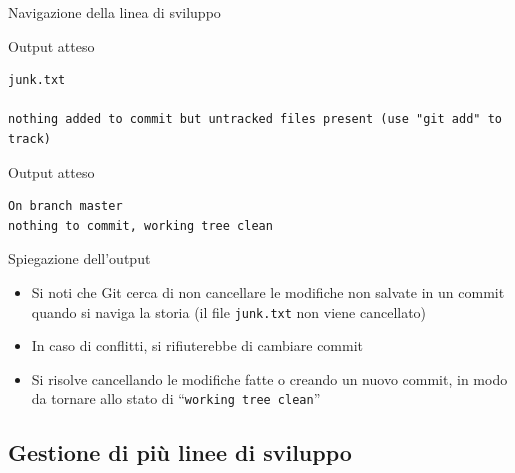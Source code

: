 \documentclass[xcolor=dvipsnames,presentation]{beamer}
\begin{document}
\begin{frame}{Navigazione della linea di sviluppo}
\begin{block}{Output atteso}
\begin{Verbatim}[fontsize=\scriptsize]
        junk.txt

nothing added to commit but untracked files present (use "git add" to track)
        \end{Verbatim}
    \end{block}
    \begin{block}{Output atteso}
        \begin{Verbatim}[fontsize=\scriptsize]
On branch master
nothing to commit, working tree clean
        \end{Verbatim}
    \end{block}
    \begin{block}{Spiegazione dell'output}
        \begin{itemize}
            \item Si noti che Git cerca di non cancellare le modifiche non salvate in un commit quando si naviga la storia (il file \texttt{junk.txt} non viene cancellato)
            \item In caso di conflitti, si rifiuterebbe di cambiare commit
            \item Si risolve cancellando le modifiche fatte o creando un nuovo commit, in modo da tornare allo stato di ``\texttt{working tree clean}''
        \end{itemize}
    \end{block}
\end{frame}

\subsection{Gestione di più linee di sviluppo}
\end{document}
